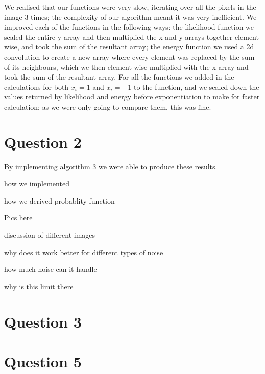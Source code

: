 \documentclass{article}
\begin{document}
We realised that our functions were very slow, iterating over all the pixels in the image 3 times; the complexity of our algorithm meant it was very inefficient. We improved each of the functions in the following ways: the likelihood function we scaled the entire y array and then multiplied the x and y arrays together element-wise, and took the sum of the resultant array; the energy function we used a 2d convolution to create a new array where every element was replaced by the sum of its neighbours, which we then element-wise multiplied with the x array and took the sum of the resultant array. For all the functions we added in the calculations for both $x_{i} = 1$ and $x_{i} = -1$ to the function, and we scaled down the values returned by likelihood and energy before exponentiation to make for faster calculation; as we were only going to compare them, this was fine.

\section*{Question 2}

By implementing algorithm 3 we were able to produce these results.

how we implemented

how we derived probablity function

Pics here

discussion of different images

why does it work better for different types of noise

how much noise can it handle

why is this limit there

\section*{Question 3}

\section*{Question 5}
\end{document}
